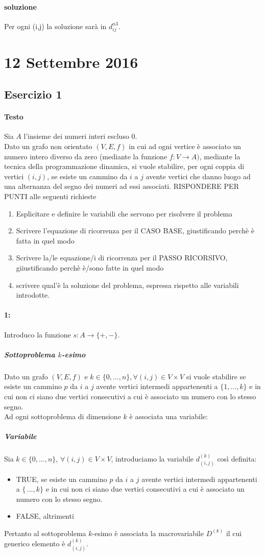 \documentclass[12pt, a4paper, openany]{book}
\begin{document}
\paragraph*{soluzione}
Per ogni (i,j) la soluzione sarà in $d_{ij}^{n3}$.
\section{12 Settembre 2016}
\subsection{Esercizio 1}
\paragraph*{Testo}Sia $A$ l'insieme dei numeri interi escluso 0.
\\Dato un grafo non orientato $(V,E,f)$ in cui ad ogni vertice è associato un numero intero diverso da zero
(mediante la funzione $f: V\to A)$, mediante la tecnica della programmazione dinamica, si vuole stabilire, per ogni coppia di vertici $(i,j)$,
se esiste un cammino da $i$ a $j$ avente vertici che danno luogo ad una alternanza del segno dei numeri ad essi associati.
RISPONDERE PER PUNTI alle seguenti richieste
\begin{enumerate}
	\item Esplicitare e definire le variabili che servono per risolvere il problema
	\item Scrivere l'equazione di ricorrenza per il CASO BASE, giustificando perchè è fatta in quel modo
	\item Scrivere la/le equazione/i di ricorrenza per il PASSO RICORSIVO, giiustificando perchè è/sono fatte in quel modo
	\item scrivere qual'è la soluzione del problema, espressa rispetto alle variabili introdotte.
\end{enumerate}

\paragraph*{1:}
Introduco la funzione $s: A\to \{+,-\}$.
\subparagraph*{Sottoproblema $k$-esimo}
Dato un grafo $(V,E,f)$ e $k\in \{0,...,n\}, \forall(i,j) \in V\times V$ si vuole stabilire se esiste un cammino $p$
da $i$ a $j$ avente vertici intermedi appartenenti a $\{1,...,k\}$ e in cui non ci siano due vertici consecutivi a cui è associato un numero con lo stesso segno.
\\Ad ogni sottoproblema di dimensione $k$ è associata una variabile:
\subparagraph*{Variabile}
Sia $k\in\{0,...,n\}$, $\forall (i,j) \in V\times V$, introduciamo la variabile $d^{(k)}_{(i,j)}$ così definita:
\begin{itemize}
	\item TRUE, se esiste un cammino $p$ da $i$ a $j$ avente vertici intermedi appartenenti a $\{\,...,k\}$ e in cui non ci siano due vertici consecutivi a cui è associato un numero con lo stesso segno.
	\item FALSE, altrimenti
\end{itemize}
Pertanto al sottoproblema $k$-esimo è associata la macrovariabile $D^{(k)}$ il cui generico elemento è $d^{(k)}_{(i,j)}$.
\end{document}
